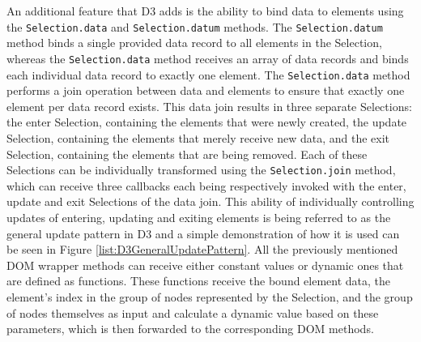 An additional feature that D3 adds is the ability to bind data to elements using the \lstinline{Selection.data} and \lstinline{Selection.datum} methods. The \lstinline{Selection.datum} method binds a single provided data record to all elements in the Selection, whereas the \lstinline{Selection.data} method receives an array of data records and binds each individual data record to exactly one element. The \lstinline{Selection.data} method performs a join operation between data and elements to ensure that exactly one element per data record exists. This data join results in three separate Selections: the enter Selection, containing the elements that were newly created, the update Selection, containing the elements that merely receive new data, and the exit Selection, containing the elements that are being removed. Each of these Selections can be individually transformed using the \lstinline{Selection.join} method, which can receive three callbacks each being respectively invoked with the enter, update and exit Selections of the data join. This ability of individually controlling updates of entering, updating and exiting elements is being referred to as the general update pattern in D3 and a simple demonstration of how it is used can be seen in Figure \ref{list:D3GeneralUpdatePattern}. All the previously mentioned DOM wrapper methods can receive either constant values or dynamic ones that are defined as functions. These functions receive the bound element data, the element's index in the group of nodes represented by the Selection, and the group of nodes themselves as input and calculate a dynamic value based on these parameters, which is then forwarded to the corresponding DOM methods. 

\begin{samepage}
 demonstration of D3's general update pattern and how it can be used to specify different transformations for entering, updating and exiting elements.
  },
]{listings/d3-join.js}
\end{samepage}

